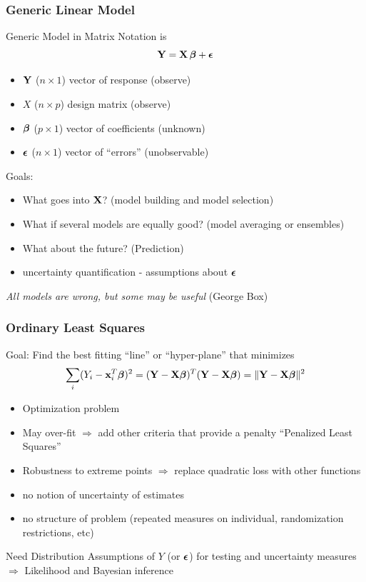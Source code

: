 \documentclass[handout]{beamer}\usepackage[]{graphicx}\usepackage[]{color}
\begin{document}
\begin{frame}
  \frametitle{Generic Linear  Model}
  Generic Model in Matrix Notation is
$$
\mathbf{Y}  = \mathbf{X} \, \boldsymbol{\beta} + \boldsymbol{\epsilon}  $$
\pause
\begin{itemize}
\item $\mathbf{Y}$ ($n \times 1$) vector of response   (observe)
\item $X$ ($n \times p$)  design matrix  (observe)
\item $\boldsymbol{\beta}$ ($p \times 1$) vector of coefficients  (unknown)
\item $\boldsymbol{\epsilon}$ ($n \times 1$) vector of ``errors''  (unobservable)
\end{itemize} \pause

Goals: \pause
\begin{itemize}
\item What goes into $\mathbf{X}$?   (model building and model selection) \pause
\item What if several models are equally good?  (model averaging or ensembles) \pause
\item What about the future?  (Prediction) \pause
\item uncertainty quantification - assumptions about $\boldsymbol{\epsilon}$\pause
\end{itemize}
{\it All models are wrong, but some may be useful }  (George Box)
\end{frame}

\begin{frame}
  \frametitle{Ordinary Least Squares}
  Goal: Find the best fitting ``line'' or ``hyper-plane'' that
  minimizes
$$\sum_i  (Y_i - \mathbf{x}_i^T \boldsymbol{\beta})^2 = (\mathbf{Y} - \mathbf{X}\boldsymbol{\beta})^T(\mathbf{Y} - \mathbf{X} \boldsymbol{\beta}) = \| \mathbf{Y} -
\mathbf{X}\boldsymbol{\beta} \|^2 $$  \pause

\begin{itemize}
\item Optimization problem \pause
\item May over-fit $\Rightarrow$ add other criteria that provide a penalty
  ``Penalized Least Squares'' \pause
\item Robustness to extreme points $\Rightarrow$ replace quadratic
  loss with other functions  \pause
\item no notion of uncertainty of estimates  \pause
\item no structure of problem  (repeated measures on individual,
  randomization restrictions, etc)
\end{itemize}
Need  Distribution Assumptions of $Y$ (or $\boldsymbol{\epsilon}$) for testing and
uncertainty measures \pause $\Rightarrow$ Likelihood  and Bayesian inference
\end{frame}
\end{document}
